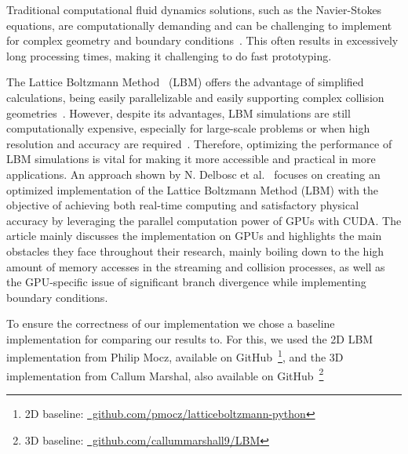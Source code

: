 \documentclass[letterpaper]{article}
\newcommand\exthref[2]{\href{#1}{\faicon{share-square-o}~#2}}
\newcommand{\INFO}[1]{{\textbf{\textcolor{orange}{}}}}
\begin{document}
Traditional computational fluid dynamics solutions, such as the Navier-Stokes~\cite{navier1838navier} equations, are computationally demanding and can be challenging to implement for complex geometry and boundary conditions~\cite{thibault2009cuda}. This often results in excessively long processing times, making it challenging to do fast prototyping. 

The Lattice Boltzmann Method~\cite{kruger2017lattice} (LBM) offers the advantage of simplified calculations, being easily parallelizable and easily supporting complex collision geometries~\cite{bao2011lattice}. However, despite its advantages, LBM simulations are still computationally expensive, especially for large-scale problems or when high resolution and accuracy are required~\cite{aidun2010lattice}. Therefore, optimizing the performance of LBM simulations is vital for making it more accessible and practical in more applications. An approach shown by N. Delbosc et al.~\cite{DELBOSC2014462} focuses on creating an optimized implementation of the Lattice Boltzmann Method (LBM) with the objective of achieving both real-time computing and satisfactory physical accuracy by leveraging the parallel computation power of GPUs with CUDA. The article mainly discusses the implementation on GPUs and highlights the main obstacles they face throughout their research, mainly boiling down to the high amount of memory accesses in the streaming and collision processes, as well as the GPU-specific issue of significant branch divergence while implementing boundary conditions. 

To ensure the correctness of our implementation we chose a baseline implementation for comparing our results to. For this, we used the 2D LBM implementation from Philip Mocz, available on GitHub~\footnote{2D baseline: \exthref{https://github.com/pmocz/latticeboltzmann-python}{github.com/pmocz/latticeboltzmann-python}}, and the 3D implementation from Callum Marshal, also available on GitHub~\footnote{3D baseline: \exthref{https://github.com/callummarshall9/LBM}{github.com/callummarshall9/LBM}}


\end{document}
